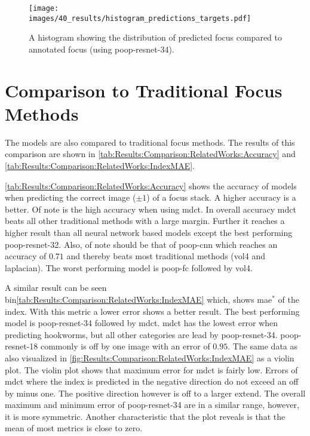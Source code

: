 \begin{figure}
    \centering
    \texttt{[image: images/40\_results/histogram\_predictions\_targets.pdf]}
    \caption{A histogram showing the distribution of predicted focus compared to annotated focus (using \acs{poop}-\acs{resnet}-34).}
    \label{fig:Results:HistogramPredictedTarget}
\end{figure}



\section{Comparison to Traditional Focus Methods}
\label{sec:Results:TraditionalFocusMethods}

The models are also compared to traditional focus methods. The results of this comparison are shown in \autoref{tab:Results:Comparison:RelatedWorks:Accuracy} and \autoref{tab:Results:Comparison:RelatedWorks:IndexMAE}.

\autoref{tab:Results:Comparison:RelatedWorks:Accuracy} shows the accuracy of models when predicting the correct image ($\pm 1$) of a focus stack. A higher accuracy is a better. Of note is the high accuracy when using \ac{mdct}. In overall accuracy \ac{mdct} beats all other traditional methods with a large margin. Further it reaches a higher result than all neural network based models except the best performing \acs{poop}-\acs{resnet}-32. Also, of note should be that of \acs{poop}-\acs{cnn} which reaches an accuracy of $0.71$ and thereby beats most traditional methods (\ac{vol4} and \ac{laplacian}). The worst performing model is \acs{poop}-\acs{fc} followed by \ac{vol4}.

A similar result can be seen bin\autoref{tab:Results:Comparison:RelatedWorks:IndexMAE} which, shows \ac{mae}$^*$ of the index. With this metric a lower error shows a better result. The best performing model is \acs{poop}-\acs{resnet}-34 followed by \acs{mdct}. \Acs{mdct} has the lowest error when predicting hookworms, but all other categories are lead by \acs{poop}-\acs{resnet}-34. \Acs{poop}-\acs{resnet}-18 commonly is off by one image with an error of $0.95$. The same data as also visualized in \autoref{fig:Results:Comparison:RelatedWorks:IndexMAE} as a violin plot. The violin plot shows that maximum error for \ac{mdct} is fairly low. Errors of \ac{mdct} where the index is predicted in the negative direction do not exceed an off by minus one. The positive direction however is off to a larger extend. The overall maximum and minimum error of \acs{poop}-\acs{resnet}-34 are in a similar range, however, it is more symmetric. Another characteristic that the plot reveals is that the mean of most metrics is close to zero.


